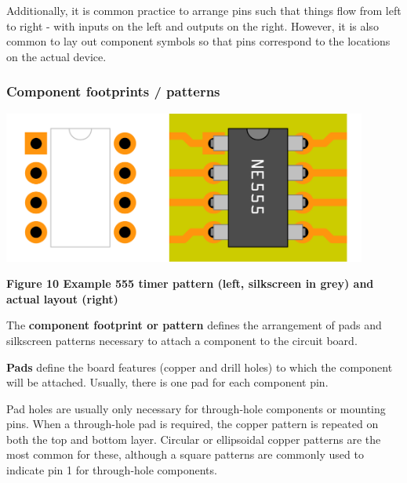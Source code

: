 \documentclass[letterpaper]{article}
\begin{document}
\bigskip

{\sffamily\color[rgb]{0.30980393,0.5058824,0.7411765}
Additionally, it is common practice to arrange pins such that things {\textquotedbl}flow{\textquotedbl} from left to
right - with inputs on the left and outputs on the right. However, it is also common to lay out component symbols so
that pins correspond to the locations on the actual device.}


\bigskip

\subsubsection{Component footprints / patterns}
\hypertarget{Toc337742692}{} \includegraphics[width=4.7189in,height=1.9681in]{figures/ee4document-img015.png} 

{\sffamily\bfseries\color[rgb]{0.30980393,0.5058824,0.7411765}
Figure 10 Example 555 timer pattern (left, silkscreen in grey) and actual layout (right)}

{\sffamily\color[rgb]{0.30980393,0.5058824,0.7411765}
The \textbf{component footprint or pattern} defines the arrangement of pads and silkscreen patterns necessary to attach
a component to the circuit board.}

{\sffamily\color[rgb]{0.30980393,0.5058824,0.7411765}
\textbf{Pads} define the board features (copper and drill holes) to which the component will be attached. Usually, there
is one pad for each component pin.}

{\sffamily\color[rgb]{0.30980393,0.5058824,0.7411765}
Pad holes are usually only necessary for through-hole components or mounting pins. When a through-hole pad is required,
the copper pattern is repeated on both the top and bottom layer. Circular or ellipsoidal copper patterns are the most
common for these, although a square patterns are commonly used to indicate pin 1 for through-hole components.}
\end{document}
